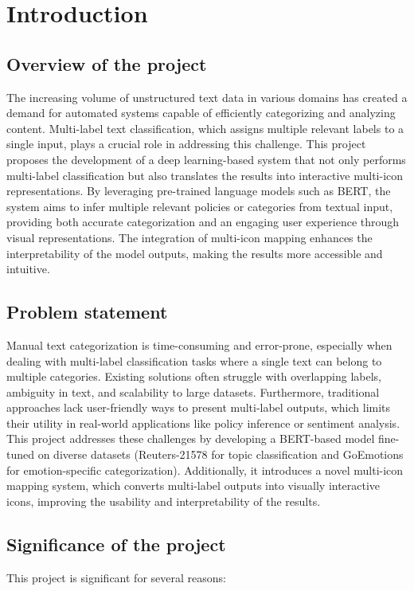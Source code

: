 \documentclass{article}
\begin{document}
\section{Introduction}
\subsection{Overview of the project}
The increasing volume of unstructured text data in various domains has created a demand for automated systems capable of efficiently categorizing and analyzing content. Multi-label text classification, which assigns multiple relevant labels to a single input, plays a crucial role in addressing this challenge. This project proposes the development of a deep learning-based system that not only performs multi-label classification but also translates the results into interactive multi-icon representations. By leveraging pre-trained language models such as BERT, the system aims to infer multiple relevant policies or categories from textual input, providing both accurate categorization and an engaging user experience through visual representations. The integration of multi-icon mapping enhances the interpretability of the model outputs, making the results more accessible and intuitive.
\subsection{Problem statement}
Manual text categorization is time-consuming and error-prone, especially when dealing with multi-label classification tasks where a single text can belong to multiple categories. Existing solutions often struggle with overlapping labels, ambiguity in text, and scalability to large datasets. Furthermore, traditional approaches lack user-friendly ways to present multi-label outputs, which limits their utility in real-world applications like policy inference or sentiment analysis. This project addresses these challenges by developing a BERT-based model fine-tuned on diverse datasets (Reuters-21578 for topic classification and GoEmotions for emotion-specific categorization). Additionally, it introduces a novel multi-icon mapping system, which converts multi-label outputs into visually interactive icons, improving the usability and interpretability of the results.
\subsection{Significance of the project}
This project is significant for several reasons:
\end{document}
